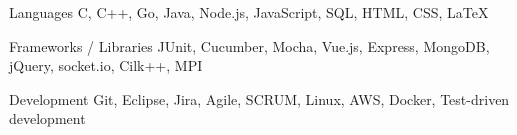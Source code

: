 
\begin{cvskills}

  \cvskill
    {Languages} %
    {C, C++, Go, Java, Node.js, JavaScript, SQL, HTML, CSS, \LaTeX} %

  \cvskill
    {Frameworks / Libraries} %
    {JUnit, Cucumber, Mocha, Vue.js, Express, MongoDB, jQuery, socket.io, Cilk++, MPI} %

  \cvskill
    {Development} %
    {Git, Eclipse, Jira, Agile, SCRUM, Linux, AWS, Docker, Test-driven development} %

\end{cvskills}